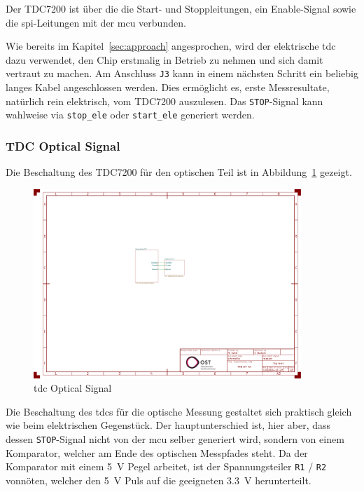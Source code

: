 \documentclass[11pt,a4paper,hidelinks]{article}
\begin{document}
Der TDC7200 ist über die die Start- und Stoppleitungen, ein Enable-Signal sowie die \acrshort{spi}-Leitungen mit der
\acrshort{mcu} verbunden.

Wie bereits im Kapitel~\ref{sec:approach} angesprochen, wird der elektrische \acrshort{tdc} dazu verwendet, den Chip
erstmalig in Betrieb zu nehmen und sich damit vertraut zu machen. Am Anschluss \lstinline|J3| kann in einem nächsten
Schritt ein beliebig langes Kabel angeschlossen werden. Dies ermöglicht es, erste Messresultate, natürlich rein elektrisch,
vom TDC7200 auszulesen. Das \lstinline|STOP|-Signal kann wahlweise via \lstinline|stop_ele| oder \lstinline|start_ele| generiert werden.

\subsubsection{TDC Optical Signal}

Die Beschaltung des TDC7200 \cite{ti2016tdc7200_datasheet} für den optischen Teil ist in
Abbildung~\ref{fig:tdc_opt_signal} gezeigt.

\begin{figure}[H]
    \centering
    \includegraphics[page=2, trim=530 330 300 310, clip, width=0.9\textwidth]{attachments/schematic.pdf}
    \caption{\acrshort{tdc} Optical Signal}\label{fig:tdc_opt_signal}
\end{figure}

Die Beschaltung des \acrshort{tdc}s für die optische Messung gestaltet sich praktisch gleich wie beim elektrischen
Gegenstück. Der hauptunterschied ist, hier aber, dass dessen \lstinline|STOP|-Signal nicht von der \acrshort{mcu} selber generiert
wird, sondern von einem Komparator, welcher am Ende des optischen Messpfades steht. Da der Komparator mit einem 5~V Pegel
arbeitet, ist der Spannungsteiler \lstinline|R1| / \lstinline|R2| vonnöten, welcher den 5~V Puls auf die geeigneten 3.3~V
herunterteilt.
\end{document}
